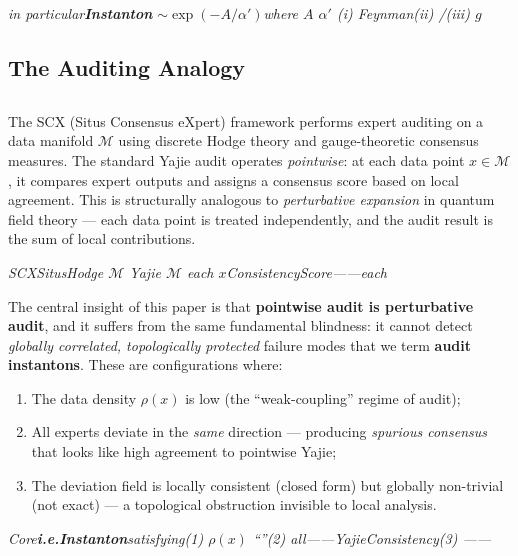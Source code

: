 \documentclass[11pt,a4paper]{article}
\theoremstyle{plain}
\theoremstyle{definition}
\newcommand{\cM}{\mathcal{M}}
\begin{document}
\bigskip
\noindent
\textit{in particular\textbf{Instanton} $\sim \exp(-A/\alpha')$where $A$ $\alpha'$ (i) \textbf{}Feynman(ii) \textbf{}/(iii)  $g$ \textbf{}}

\subsection{The Auditing Analogy}
\subsection*{}

The SCX (Situs Consensus eXpert) framework \cite{scx_framework} performs 
expert auditing on a data manifold $\cM$ using discrete Hodge theory and 
gauge-theoretic consensus measures. The standard Yajie audit operates 
\emph{pointwise}: at each data point $x \in \cM$, it compares expert 
outputs and assigns a consensus score based on local agreement. This is 
structurally analogous to \emph{perturbative expansion} in quantum field 
theory — each data point is treated independently, and the audit result is 
the sum of local contributions.

\bigskip
\noindent
\textit{SCXSitusHodge $\cM$ Yajie\textbf{} $\cM$ each $x$ConsistencyScore\textbf{}——each}

The central insight of this paper is that \textbf{pointwise audit is perturbative 
audit}, and it suffers from the same fundamental blindness: it cannot detect 
\emph{globally correlated, topologically protected} failure modes that we term 
\textbf{audit instantons}. These are configurations where:

\begin{enumerate}[label=(\arabic*)]
  \item The data density $\rho(x)$ is low (the ``weak-coupling'' regime of audit);
  \item All experts deviate in the \emph{same} direction — producing \emph{spurious 
        consensus} that looks like high agreement to pointwise Yajie;
  \item The deviation field is locally consistent (closed form) but globally 
        non-trivial (not exact) — a topological obstruction invisible to 
        local analysis.
\end{enumerate}

\bigskip
\noindent
\textit{Core\textbf{i.e.}\textbf{Instanton}\textbf{}satisfying(1)  $\rho(x)$ ``''(2) all\textbf{}——YajieConsistency\textbf{}(3) ——}
\end{document}
